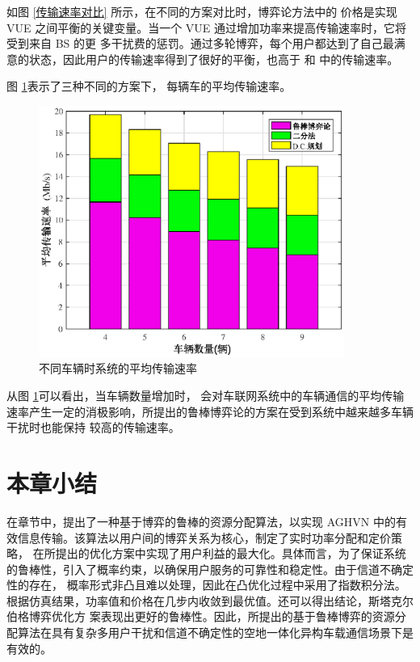 如图 \ref{传输速率对比} 所示，在不同的方案对比时，博弈论方法中的
价格是实现 VUE 之间平衡的关键变量。当一个 VUE 通过增加功率来提高传输速率时，它将受到来自 BS 的更
多干扰费的惩罚。通过多轮博弈，每个用户都达到了自己最满意的状态，因此用户的传输速率得到了很好的平衡，也高于 \cite{PCID}和 \cite{ACAR}中的传输速率。

图 \ref{不同车辆}表示了三种不同的方案下，%
每辆车的平均传输速率。
\begin{figure}[H]
\centering
\includegraphics[width=10cm]{figures//chap2//不同车辆.eps}
\caption{不同车辆时系统的平均传输速率}
\label{不同车辆}
\end{figure}

从图 \ref{不同车辆}可以看出，当车辆数量增加时，
会对车联网系统中的车辆通信的平均传输速率产生一定的消极影响，所提出的鲁棒博弈论的方案在受到系统中越来越多车辆干扰时也能保持
较高的传输速率。%
\section{本章小结}\label{section2-5}
在章节中，提出了一种基于博弈的鲁棒的资源分配算法，以实现 AGHVN 中的有效信息传输。该算法以用户间的博弈关系为核心，制定了实时功率分配和定价策略，
在所提出的优化方案中实现了用户利益的最大化。具体而言，为了保证系统的鲁棒性，引入了概率约束，以确保用户服务的可靠性和稳定性。由于信道不确定性的存在，
概率形式非凸且难以处理，因此在凸优化过程中采用了指数积分法。根据仿真结果，功率值和价格在几步内收敛到最优值。还可以得出结论，斯塔克尔伯格博弈优化方
案表现出更好的鲁棒性。因此，所提出的基于鲁棒博弈的资源分配算法在具有复杂多用户干扰和信道不确定性的空地一体化异构车载通信场景下是有效的。
























